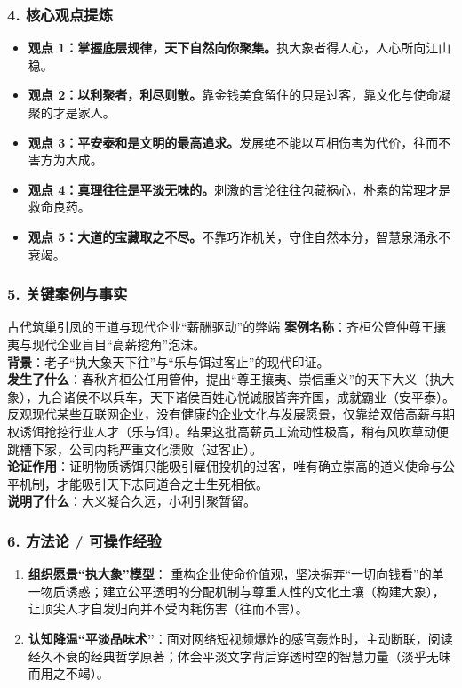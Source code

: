 \subsubsection{4. 核心观点提炼}
\begin{itemize}
    \item \textbf{观点 1：掌握底层规律，天下自然向你聚集。}执大象者得人心，人心所向江山稳。
    \item \textbf{观点 2：以利聚者，利尽则散。}靠金钱美食留住的只是过客，靠文化与使命凝聚的才是家人。
    \item \textbf{观点 3：平安泰和是文明的最高追求。}发展绝不能以互相伤害为代价，往而不害方为大成。
    \item \textbf{观点 4：真理往往是平淡无味的。}刺激的言论往往包藏祸心，朴素的常理才是救命良药。
    \item \textbf{观点 5：大道的宝藏取之不尽。}不靠巧诈机关，守住自然本分，智慧泉涌永不衰竭。
\end{itemize}

\subsubsection{5. 关键案例与事实}
\begin{CaseBox}{古代筑巢引凤的王道与现代企业“薪酬驱动”的弊端}
\textbf{案例名称}：齐桓公管仲尊王攘夷与现代企业盲目“高薪挖角”泡沫。\\
\textbf{背景}：老子“执大象天下往”与“乐与饵过客止”的现代印证。\\
\textbf{发生了什么}：春秋齐桓公任用管仲，提出“尊王攘夷、崇信重义”的天下大义（执大象），九合诸侯不以兵车，天下诸侯百姓心悦诚服皆奔齐国，成就霸业（安平泰）。反观现代某些互联网企业，没有健康的企业文化与发展愿景，仅靠给双倍高薪与期权诱饵抢挖行业人才（乐与饵）。结果这批高薪员工流动性极高，稍有风吹草动便跳槽下家，公司内耗严重文化溃败（过客止）。\\
\textbf{论证作用}：证明物质诱饵只能吸引雇佣投机的过客，唯有确立崇高的道义使命与公平机制，才能吸引天下志同道合之士生死相依。\\
\textbf{说明了什么}：大义凝合久远，小利引聚暂留。
\end{CaseBox}

\subsubsection{6. 方法论 / 可操作经验}
\begin{enumerate}
    \item \textbf{组织愿景“执大象”模型}：
    重构企业使命价值观，坚决摒弃“一切向钱看”的单一物质诱惑；建立公平透明的分配机制与尊重人性的文化土壤（构建大象），让顶尖人才自发归向并不受内耗伤害（往而不害）。
    \item \textbf{认知降温“平淡品味术”}：面对网络短视频爆炸的感官轰炸时，主动断联，阅读经久不衰的经典哲学原著；体会平淡文字背后穿透时空的智慧力量（淡乎无味而用之不竭）。
\end{enumerate}

